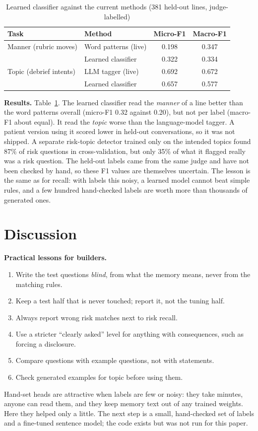 \documentclass[journal]{IEEEtran}
\begin{document}
\begin{table}[t]
\caption{Learned classifier against the current methods (381 held-out lines, judge-labelled)}
\label{tab:clf}
\centering
\footnotesize
\begin{tabular}{@{}llcc@{}}
\toprule
Task & Method & Micro-F1 & Macro-F1\\
\midrule
Manner (rubric moves) & Word patterns (live) & 0.198 & 0.347\\
& Learned classifier & 0.322 & 0.334\\
\midrule
Topic (debrief intents) & LLM tagger (live) & 0.692 & 0.672\\
& Learned classifier & 0.657 & 0.577\\
\bottomrule
\end{tabular}
\end{table}

\textbf{Results.} Table~\ref{tab:clf}. The learned classifier read the \emph{manner} of a line better than the word patterns overall (micro-F1 0.32 against 0.20), but not per label (macro-F1 about equal). It read the \emph{topic} worse than the language-model tagger. A patient
version using it scored lower in held-out conversations, so it was not shipped. A separate risk-topic detector trained only on the intended topics
found 87\% of risk questions in cross-validation, but only 35\% of what it flagged really was a risk question. The held-out labels came from the
same judge and have not been checked by hand, so these F1 values are themselves uncertain. The lesson is the same as for recall: with labels this
noisy, a learned model cannot beat simple rules, and a few hundred hand-checked labels are worth more than thousands of generated ones.

\section{Discussion}
\textbf{Practical lessons for builders.}
\begin{enumerate}
\item Write the test questions \emph{blind}, from what the memory means, never from the matching rules.
\item Keep a test half that is never touched; report it, not the tuning half.
\item Always report wrong risk matches next to risk recall.
\item Use a stricter ``clearly asked'' level for anything with consequences, such as forcing a disclosure.
\item Compare questions with example questions, not with statements.
\item Check generated examples for topic before using them.
\end{enumerate}
Hand-set heads are attractive when labels are few or noisy: they take minutes, anyone can read them, and they keep memory text out of any trained
weights. Here they helped only a little. The next step is a small, hand-checked set of labels and a fine-tuned sentence model; the code exists but
was not run for this paper.
\end{document}
